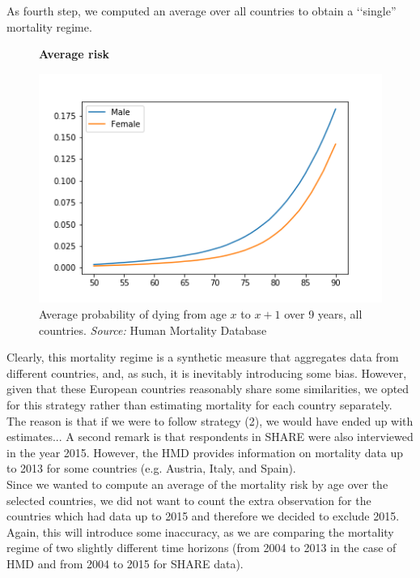 As fourth step, we computed an average over all countries to obtain a \lq\lq single'' mortality regime.   

\begin{figure}[H]
    \centering \textbf{Average risk}\par\medskip
        \centering
        \includegraphics[scale=.5]{images/Average_mortality_all_countries.png}
    \caption{Average probability of dying from age $x$ to $x+1$   over 9 years, all countries. \textit{Source:} Human Mortality Database }
    \label{fig:averages}
\end{figure}

Clearly, this mortality regime is a synthetic measure that aggregates data from different countries, and, as such, it is inevitably introducing some bias. However, given that these European countries reasonably share some similarities, we opted for this strategy rather than estimating mortality for each country separately. The reason is that if we were to follow strategy (2), we would have ended up with estimates...
A second remark is that respondents in SHARE were also interviewed in the year 2015. However, the HMD provides information on mortality data up to 2013 for some countries (e.g. Austria, Italy, and Spain).\\
Since we wanted to compute an average of the mortality risk by age over the selected countries, we did not want to count the extra observation for the countries which had data up to 2015 and therefore we decided to exclude 2015. Again, this will introduce some inaccuracy, as we are comparing the mortality regime of two slightly different time horizons (from 2004 to 2013 in the case of HMD and from 2004 to 2015 for SHARE data). 










